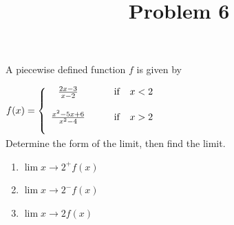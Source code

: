 \documentclass{ximera}
\title[Problem 6]{Problem 6}
\begin{document}
\begin{abstract} \end{abstract}
\maketitle

\begin{problem}
A  piecewise defined function $f$ is given by 
 
	$f(x) =   \left\{ \begin{array}{cl}
	\frac{2 x-3}{x-2}		 	&	\qquad \text{if }\hspace{0.1in}  x <  2					\\ \\
	\frac{x^2-5x +6}{x^2-4}	&	\qquad \text{if } \hspace{0.1in}   x>2 	\\ \\
		
						\end{array} \right.  $\\[1em]
	Determine the form of the limit, then find the limit.
  \begin{enumerate}

    \item $ \displaystyle \lim{x \to 2^+} f(x)$
\item   $ \displaystyle \lim{x \to 2^-} f(x)$
\item $ \displaystyle \lim{x \to 2} f(x)$
\end{enumerate}
\end{problem}
\end{document}
